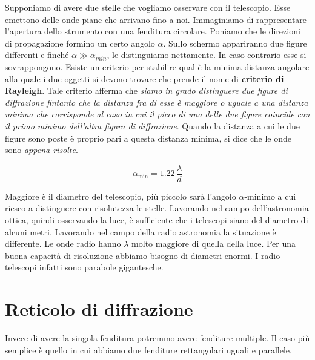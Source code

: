 \begin{figure}[htpb]
\end{figure}
\FloatBarrier

Supponiamo di avere due stelle che vogliamo osservare con il telescopio. Esse emettono delle onde piane che arrivano fino a noi. Immaginiamo di rappresentare l'apertura dello strumento con una fenditura circolare. Poniamo che le direzioni di propagazione formino un certo angolo $\alpha$. Sullo schermo appariranno due figure differenti e finché $\alpha \gg\alpha_{min} $, le distinguiamo nettamente. In caso contrario esse si sovrappongono. Esiste un criterio per stabilire qual è la minima distanza angolare alla quale i due oggetti si devono trovare che prende il nome di \textbf{criterio di Rayleigh}. Tale criterio afferma che \emph{siamo in grado distinguere due figure di diffrazione fintanto che la distanza fra di esse è maggiore o uguale a una distanza minima che corrisponde al caso in cui il picco di una delle due figure coincide con il primo minimo dell'altra figura di diffrazione}. Quando la distanza a cui le due figure sono poste è proprio pari a questa distanza minima, si dice che le onde sono \emph{appena risolte}.

\[
	\alpha_{\text{min}} = 1.22\,\frac{\lambda}{d}
\]

Maggiore è il diametro del telescopio, più piccolo sarà l'angolo $\alpha$-minimo a cui riesco a distinguere con risolutezza le stelle. Lavorando nel campo dell'astronomia ottica, quindi osservando la luce, è sufficiente che i telescopi siano del diametro di alcuni metri. Lavorando nel campo della radio astronomia la situazione è differente. Le onde radio hanno $\lambda$ molto maggiore di quella della luce. Per una buona capacità di risoluzione abbiamo bisogno di diametri enormi. I radio telescopi infatti sono parabole gigantesche.

\section{Reticolo di diffrazione}

Invece di avere la singola fenditura potremmo avere fenditure multiple. Il caso più semplice è quello in cui abbiamo due fenditure rettangolari uguali e parallele.

